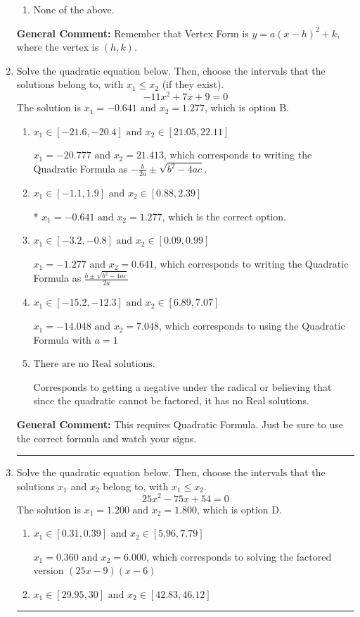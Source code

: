 \documentclass{extbook}[14pt]
\newcommand{\litem}[1]{\item #1

\rule{\textwidth}{0.4pt}}
\begin{document}
\begin{enumerate}
{\begin{enumerate}[label=\Alph*.]
\begin{multicols}{2}
\end{multicols}\item None of the above.\end{enumerate}
\textbf{General Comment:} Remember that Vertex Form is $y = a(x-h)^2+k$, where the vertex is $(h, k)$.
}
\litem{
Solve the quadratic equation below. Then, choose the intervals that the solutions belong to, with $x_1 \leq x_2$ (if they exist).
\[ -11x^{2} +7 x + 9 = 0 \]The solution is \( x_1 = -0.641 \text{ and } x_2 = 1.277 \), which is option B.\begin{enumerate}[label=\Alph*.]
\item \( x_1 \in [-21.6, -20.4] \text{ and } x_2 \in [21.05, 22.11] \)

 $x_1 = -20.777 \text{ and } x_2 = 21.413$, which corresponds to writing the Quadratic Formula as $-\frac{b}{2a} \pm \sqrt{b^2 - 4ac}$.
\item \( x_1 \in [-1.1, 1.9] \text{ and } x_2 \in [0.88, 2.39] \)

* $x_1 = -0.641 \text{ and } x_2 = 1.277$, which is the correct option.
\item \( x_1 \in [-3.2, -0.8] \text{ and } x_2 \in [0.09, 0.99] \)

 $x_1 = -1.277 \text{ and } x_2 = 0.641$, which corresponds to writing the Quadratic Formula as $\frac{b \pm \sqrt{b^2 - 4ac}}{2a}$
\item \( x_1 \in [-15.2, -12.3] \text{ and } x_2 \in [6.89, 7.07] \)

 $x_1 = -14.048 \text{ and } x_2 = 7.048$, which corresponds to using the Quadratic Formula with $a=1$
\item \( \text{There are no Real solutions.} \)

Corresponds to getting a negative under the radical or believing that since the quadratic cannot be factored, it has no Real solutions.
\end{enumerate}

\textbf{General Comment:} This requires Quadratic Formula. Just be sure to use the correct formula and watch your signs.
}
\litem{
Solve the quadratic equation below. Then, choose the intervals that the solutions $x_1$ and $x_2$ belong to, with $x_1 \leq x_2$.
\[ 25x^{2} -75 x + 54 = 0 \]The solution is \( x_1 = 1.200 \text{ and } x_2 = 1.800 \), which is option D.\begin{enumerate}[label=\Alph*.]
\item \( x_1 \in [0.31, 0.39] \text{ and } x_2 \in [5.96, 7.79] \)

$x_1 = 0.360 \text{ and } x_2 = 6.000$, which corresponds to solving the factored version $(25x -9)(x -6)$
\item \( x_1 \in [29.95, 30] \text{ and } x_2 \in [42.83, 46.12] \)


\end{enumerate}}
\end{enumerate}
\end{document}
